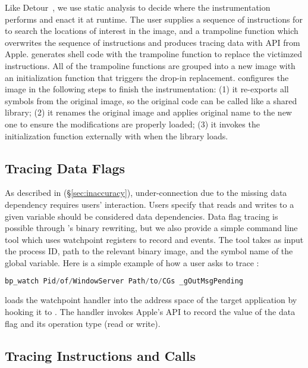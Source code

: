 Like Detour~\cite{hunt1999detours}, we use static analysis to decide where the
instrumentation performs and enact it at runtime. The user supplies a sequence
of instructions for \xxx to search the locations of interest in the image, and a
trampoline function which overwrites the sequence of instructions and produces
tracing data with API  from Apple. \xxx generates shell code
with the trampoline function to replace the victimzed instructions. All of
the trampoline functions are grouped into a new image with an initialization
function that triggers the drop-in replacement. \xxx configures the image in the
following steps to finish the instrumentation: (1) it re-exports all symbols
from the original image, so the original code can be called like a shared
library; (2) it renames the original image and applies original name to the
new one to ensure the modifications are properly loaded; (3) it invokes the
initialization function externally with  when the library
loads.

\subsection{Tracing Data Flags} \label{subsec:tcp}

As described in (\S\ref{sec:inaccuracy}), under-connection due to the missing
data dependency requires users' interaction. Users specify that reads and
writes to a given variable should be considered data dependencies.
Data flag tracing is possible through \xxx's binary rewriting, but we also
provide a simple command line tool which uses watchpoint registers to record
\dataflagwrite and \dataflagread events. The tool  takes as input
the process ID, path to the relevant binary image, and the symbol name of the
global variable. Here is a simple example of how a user asks \xxx to trace
:
\begin{lstlisting}[language=c++,numbers=none]
bp_watch Pid/of/WindowServer Path/to/CGs _gOutMsgPending
\end{lstlisting}
\noindent \xxx loads the watchpoint handler into the address space of the target
application by hooking it to . The handler invokes Apple's
API  to record the value of the data flag and its operation
type (read or write).

\subsection{Tracing Instructions and Calls}

